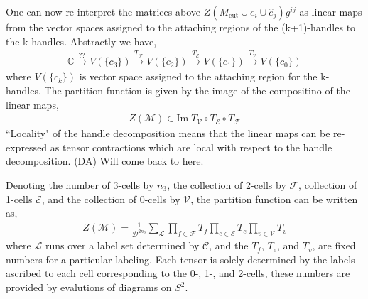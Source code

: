 \documentclass[12pt,a4paper]{article}
\newcounter{arrow}
\newcommand{\tp}{\otimes}
\newcommand{\mce}{\mathcal{E}}
\newcommand{\cc}{\mathbb{C}}
\newcommand{\mcd}{\mathcal{D}}
\newcommand{\mcl}{\mathcal{L}}
\newcommand{\mcc}{\mathcal{C}}
\newcommand{\mcm}{\mathcal{M}}
\newcommand{\mcv}{\mathcal{V}}
\newcommand{\mcf}{\mathcal{F}}
\newcommand{\kw}[1]{{\color{kwcolor}\footnotesize{(KW) #1}}}
\newcommand{\dave}[1]{{\color{ao(english)}\footnotesize{(DA) #1}}}
\begin{document}
One can now re-interpret the matrices above $Z(M_{\text{cut}} \cup e_i \cup \hat{e}_j)g^{ij}$ as linear maps from the vector spaces assigned to 
the attaching regions of the (k+1)-handles to the k-handles. 
Abstractly we have,
\begin{align}\nonumber
\cc \xrightarrow{??}V(\{ c_3 \}) \xrightarrow{T_{\mcf}} V(\{ c_2 \})  \xrightarrow{T_{\mce}} V(\{ c_1 \})  \xrightarrow{T_{\mcv}} V(\{ c_0 \}) 
\end{align}
where $V(\{c_k \})$ is vector space assigned to the attaching region for the k-handles. 
The partition function is given by the image of the compositino of the linear maps,
\begin{align}
Z(\mcm) \in \text{Im} \; T_{\mcv} \circ T_{\mce} \circ T_{\mcf}
\end{align}
``Locality" of the handle decomposition means that the linear maps can be re-expressed as tensor contractions which are local with respect to the handle decomposition.
\dave{Will come back to here.}


Denoting the number of 3-cells by $n_3$, the collection of 2-cells by $\mcf$, 
collection of 1-cells $\mce$, and the collection of 0-cells by $\mcv$, 
the partition function can be written as,
\begin{align}
Z(\mcm) = \frac{1}{\mcd^{2 n_3}}\sum_{\mcl} \prod_{f \in \mcf} T_f \prod_{e \in \mce} T_e \prod_{v \in \mcv} T_v
\label{TVBWss}
\end{align}
where $\mcl$ runs over a label set determined by $\mcc$, 
and the $T_f$, $T_e$, and $T_v$, 
are fixed numbers for a particular labeling. 
Each tensor is solely determined by the labels ascribed to each cell corresponding to the 0-, 1-, and 2-cells,
these numbers are provided by evalutions of diagrams on $S^2$.
\end{document}
